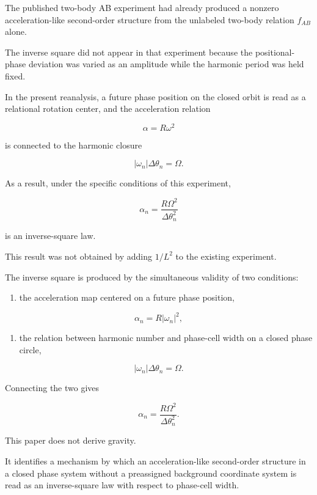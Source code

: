 \documentclass[
  a4paper,
]{article}
\providecommand{\tightlist}{%
  \setlength{\itemsep}{0pt}\setlength{\parskip}{0pt}}
\begin{document}
The published two-body AB experiment had already produced a nonzero
acceleration-like second-order structure from the unlabeled two-body
relation \(f_{AB}\) alone.

The inverse square did not appear in that experiment because the
positional-phase deviation was varied as an amplitude while the harmonic
period was held fixed.

In the present reanalysis, a future phase position on the closed orbit
is read as a relational rotation center, and the acceleration relation

\[
\alpha=R\omega^2
\]

is connected to the harmonic closure

\[
|\omega_n|\Delta\theta_n=\Omega.
\]

As a result, under the specific conditions of this experiment,

\[
\alpha_n
=\frac{R\Omega^2}{\Delta\theta_n^2}
\]

is an inverse-square law.

This result was not obtained by adding \(1/L^2\) to the existing
experiment.

The inverse square is produced by the simultaneous validity of two
conditions:

\begin{enumerate}
\def\labelenumi{\arabic{enumi}.}
\tightlist
\item
  the acceleration map centered on a future phase position,
\end{enumerate}

\[
\alpha_n=R|\omega_n|^2,
\]

\begin{enumerate}
\def\labelenumi{\arabic{enumi}.}
\setcounter{enumi}{1}
\tightlist
\item
  the relation between harmonic number and phase-cell width on a closed
  phase circle,
\end{enumerate}

\[
|\omega_n|\Delta\theta_n=\Omega.
\]

Connecting the two gives

\[
\boxed{
\alpha_n
=\frac{R\Omega^2}{\Delta\theta_n^2}
}.
\]

This paper does not derive gravity.

It identifies a mechanism by which an acceleration-like second-order
structure in a closed phase system without a preassigned background
coordinate system is read as an inverse-square law with respect to
phase-cell width.
\end{document}

